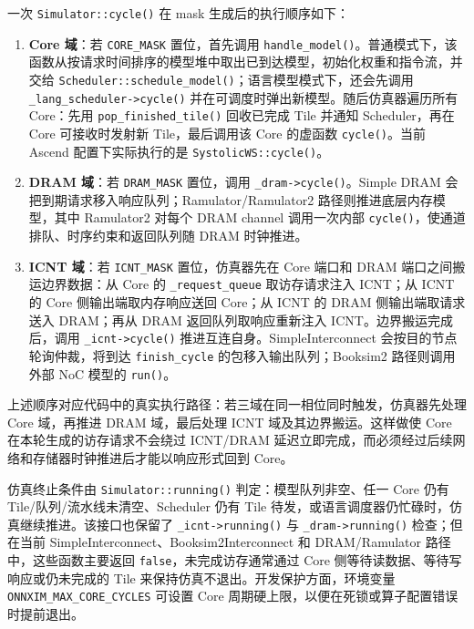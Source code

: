 \documentclass{CjC}
\begin{document}
    一次 \texttt{Simulator::cycle()} 在 mask 生成后的执行顺序如下：
    \begin{enumerate}
        \item \textbf{Core 域}：若 \texttt{CORE\_MASK} 置位，首先调用 \texttt{handle\_model()}。普通模式下，该函数从按请求时间排序的模型堆中取出已到达模型，初始化权重和指令流，并交给
            \texttt{Scheduler::schedule\_model()}；语言模型模式下，还会先调用 \texttt{\_lang\_scheduler->cycle()} 并在可调度时弹出新模型。随后仿真器遍历所有 Core：先用
            \texttt{pop\_finished\_tile()} 回收已完成 Tile 并通知 Scheduler，再在 Core 可接收时发射新 Tile，最后调用该 Core 的虚函数
            \texttt{cycle()}。当前 Ascend 配置下实际执行的是 \texttt{SystolicWS::cycle()}。

        \item \textbf{DRAM 域}：若 \texttt{DRAM\_MASK} 置位，调用 \texttt{\_dram->cycle()}。Simple DRAM 会把到期请求移入响应队列；Ramulator/Ramulator2 路径则推进底层内存模型，其中 Ramulator2 对每个 DRAM channel 调用一次内部
            \texttt{cycle()}，使通道排队、时序约束和返回队列随 DRAM 时钟推进。

        \item \textbf{ICNT 域}：若 \texttt{ICNT\_MASK} 置位，仿真器先在 Core 端口和 DRAM 端口之间搬运边界数据：从 Core 的
            \texttt{\_request\_queue} 取访存请求注入 ICNT；从 ICNT 的 Core 侧输出端取内存响应送回 Core；从 ICNT 的 DRAM 侧输出端取请求送入 DRAM；再从 DRAM 返回队列取响应重新注入
            ICNT。边界搬运完成后，调用 \texttt{\_icnt->cycle()} 推进互连自身。SimpleInterconnect 会按目的节点轮询仲裁，将到达
            \texttt{finish\_cycle} 的包移入输出队列；Booksim2 路径则调用外部 NoC 模型的 \texttt{run()}。
    \end{enumerate}

    上述顺序对应代码中的真实执行路径：若三域在同一相位同时触发，仿真器先处理 Core 域，再推进 DRAM 域，最后处理 ICNT 域及其边界搬运。这样做使 Core 在本轮生成的访存请求不会绕过 ICNT/DRAM 延迟立即完成，而必须经过后续网络和存储器时钟推进后才能以响应形式回到 Core。

    仿真终止条件由 \texttt{Simulator::running()} 判定：模型队列非空、任一 Core 仍有
    Tile/队列/流水线未清空、Scheduler 仍有 Tile 待发，或语言调度器仍忙碌时，仿真继续推进。该接口也保留了
    \texttt{\_icnt->running()} 与 \texttt{\_dram->running()} 检查；但在当前 SimpleInterconnect、Booksim2Interconnect
    和 DRAM/Ramulator 路径中，这些函数主要返回 \texttt{false}，未完成访存通常通过 Core 侧等待读数据、等待写响应或仍未完成的 Tile 来保持仿真不退出。开发保护方面，环境变量
    \texttt{ONNXIM\_MAX\_CORE\_CYCLES} 可设置 Core 周期硬上限，以便在死锁或算子配置错误时提前退出。
\end{document}
